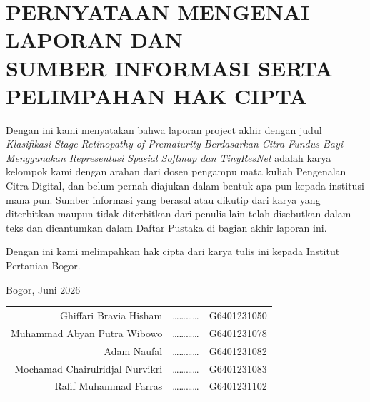 
\chapter*{PERNYATAAN MENGENAI LAPORAN DAN\\
SUMBER INFORMASI SERTA PELIMPAHAN HAK CIPTA}
\thispagestyle{empty}

Dengan ini kami menyatakan bahwa laporan project akhir dengan judul
\textit{Klasifikasi Stage Retinopathy of Prematurity Berdasarkan Citra Fundus Bayi
Menggunakan Representasi Spasial Softmap dan TinyResNet}
adalah karya kelompok kami dengan arahan dari dosen pengampu mata kuliah
Pengenalan Citra Digital, dan belum pernah diajukan dalam bentuk apa pun kepada
institusi mana pun.
Sumber informasi yang berasal atau dikutip dari karya yang diterbitkan maupun
tidak diterbitkan dari penulis lain telah disebutkan dalam teks dan dicantumkan
dalam Daftar Pustaka di bagian akhir laporan ini.

Dengan ini kami melimpahkan hak cipta dari karya tulis ini kepada Institut
Pertanian Bogor.

\vspace{1.5cm}

\begin{flushright}
Bogor, Juni 2026\\[1.5cm]
\begin{tabular}{r c l}
Ghiffari Bravia Hisham          & \ldots\ldots\ldots\ldots & G6401231050 \\[0.5cm]
Muhammad Abyan Putra Wibowo     & \ldots\ldots\ldots\ldots & G6401231078 \\[0.5cm]
Adam Naufal                     & \ldots\ldots\ldots\ldots & G6401231082 \\[0.5cm]
Mochamad Chairulridjal Nurvikri & \ldots\ldots\ldots\ldots & G6401231083 \\[0.5cm]
Rafif Muhammad Farras           & \ldots\ldots\ldots\ldots & G6401231102 \\
\end{tabular}
\end{flushright}
